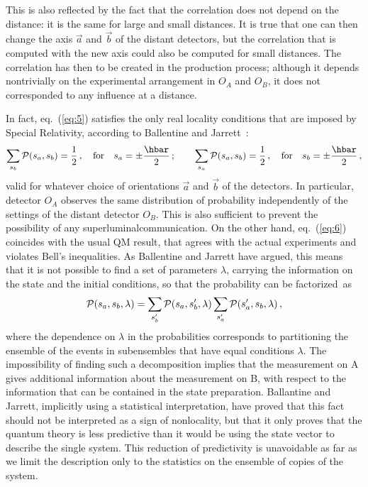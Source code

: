 \documentclass[12pt]{article}
\begin{document}
This is also reflected by the fact that the correlation does not
depend on the distance: it is the same for large and small
distances. It is true that one can then change the axis $\vec a$ and
$\vec b$ of the distant detectors, but the correlation that is
computed with the new axis could also be computed for small
distances. The correlation has then to be created in the production
process; although it depends nontrivially on the experimental
arrangement in $O_A$ and $O_B$, it does not corresponded to any
influence at a distance.

In fact, eq.~(\ref{eq:5}) satisfies the only real locality
conditions that are imposed by Special Relativity, according to
Ballentine and Jarrett~\cite{BaJa87}:
\begin{equation}
\sum_{s_b}{\cal P}(s_a,s_b)=\frac12\,, \quad {\rm for} \quad
s_a=\pm\frac\hbar2\,; \qquad 
\sum_{s_a}{\cal P}(s_a,s_b)=\frac12\,,
\quad {\rm for} \quad s_b=\pm\frac\hbar2\,, \label{eq:7}
\end{equation}
valid for whatever choice of orientations $\vec a$ and $\vec b$ of the
detectors. In particular, detector $O_A$ observes the same
distribution of probability independently of the settings of the
distant detector $O_B$. This is also sufficient to prevent the
possibility of any superluminal\pagebreak[3] communication. On the other hand,
eq.~(\ref{eq:6}) coincides with the usual QM result, that agrees with
the actual experiments and violates Bell's inequalities. As Ballentine
and Jarrett have argued, this means that it is not possible to find a
set of parameters $\lambda$, carrying the information on the state and
the initial conditions, so that the probability can be factorized~as
\begin{equation}
{\cal P}(s_a,s_b,\lambda)=\sum_{s'_b}{\cal P}(s_a,s'_b,\lambda)
\sum_{s'_a}{\cal P}(s'_a,s_b,\lambda)\,,
\end{equation}
where the dependence on $\lambda$ in the probabilities corresponds
to partitioning the ensemble of the events in subensembles that
have equal conditions $\lambda$. The impossibility of finding such
a decomposition implies that the measurement on A gives additional
information about the measurement on B, with respect to the
information that can be contained in the state preparation.
Ballantine and Jarrett, implicitly using a statistical
interpretation, have proved that this fact should not be
interpreted as a sign of nonlocality, but that it only proves that
the quantum theory is less predictive than it would be using the
state vector to describe the single system. This reduction of
predictivity is unavoidable as far as we limit the description
only to the statistics on the ensemble of copies of the system.
\end{document}
